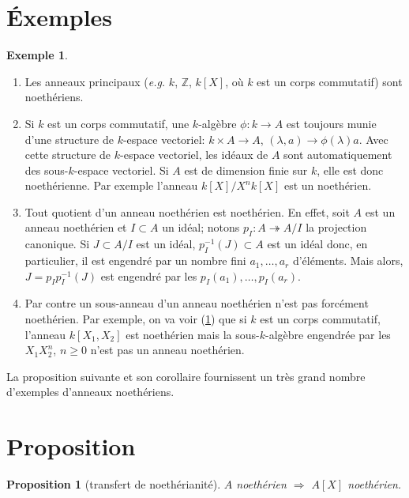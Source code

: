 \documentclass[a4paper, oneside, 12pt]{book}
\theoremstyle{theoremeStyle} %
\newtheorem{proposition}[theoreme]{Proposition}
\theoremstyle{definition} %
\newtheorem{exemple}[theoreme]{Exemple}
\newcommand{\Z}{\mathbb{Z}}
\begin{document}
\section{Éxemples}
\begin{exemple}\label{NoethEx}
  \begin{enumerate}[leftmargin=* ,parsep=0cm,itemsep=0cm,topsep=0cm]
  \item  Les anneaux principaux (\textit{e.g.} $k$, $\Z$, $k[X]$, où $k$ est un corps commutatif) sont noethériens.
  \item  Si $k$ est un corps commutatif, une  $k$-algèbre $\phi:k\rightarrow A$ est toujours munie d'une structure de $k$-espace vectoriel: $k\times A\rightarrow A$, $(\lambda,a)\rightarrow \phi(\lambda)a$. Avec cette structure de $k$-espace vectoriel, les idéaux de $A$ sont automatiquement des sous-$k$-espace vectoriel. Si $A$ est de dimension finie sur $k$, elle est donc noethérienne. Par exemple l'anneau $k[X]/X^nk[X]$ est un  noethérien.
  \item  Tout quotient d'un anneau noethérien est noethérien. En effet, soit $A$ est un anneau noethérien et $I\subset A$  un idéal; notons $p_I:A\twoheadrightarrow A/I$ la projection canonique. Si $J\subset A/I$ est un idéal, $p_I^{-1}(J)\subset A$ est un idéal donc, en particulier, il est engendré par un nombre fini $a_1,\dots, a_r$ d'éléments. Mais alors, $J=p_Ip_I^{-1}(J)$ est engendré par les  $p_I(a_1),\dots, p_I(a_r)$.
  \item Par contre un sous-anneau d'un anneau noethérien n'est pas forcément noethérien. Par exemple, on va voir (\ref{NoethTransfert}) que si $k$ est un corps commutatif, l'anneau $k[X_1,X_2]$ est noethérien mais la sous-$k$-algèbre engendrée par les $  X_1X_2^n$, $n\geq 0$ n'est pas un anneau noethérien.\\
  \end{enumerate}
\end{exemple}

La proposition suivante et son corollaire fournissent un très grand nombre d'exemples d'anneaux noethériens.

\section{Proposition}
\begin{proposition}[transfert de noethérianité]\label{NoethTransfert}
  $A$ noethérien $\Rightarrow$ $A[X]$ noethérien.
\end{proposition}
\end{document}
